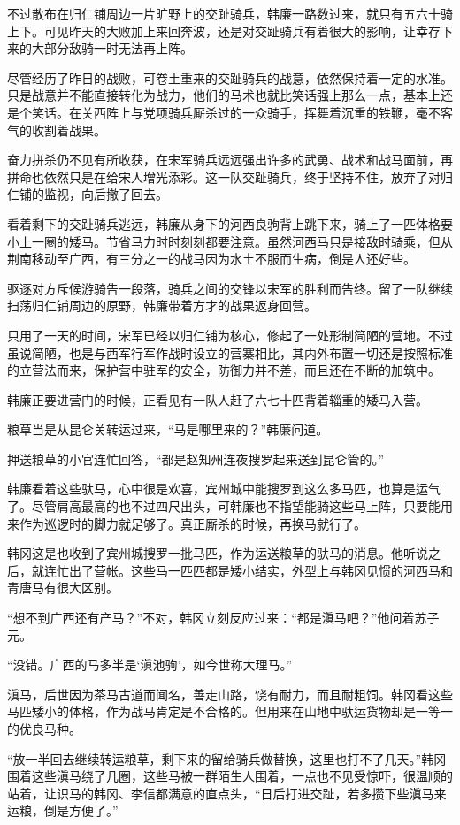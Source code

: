不过散布在归仁铺周边一片旷野上的交趾骑兵，韩廉一路数过来，就只有五六十骑上下。可见昨天的大败加上来回奔波，还是对交趾骑兵有着很大的影响，让幸存下来的大部分敌骑一时无法再上阵。

尽管经历了昨日的战败，可卷土重来的交趾骑兵的战意，依然保持着一定的水准。只是战意并不能直接转化为战力，他们的马术也就比笑话强上那么一点，基本上还是个笑话。在关西阵上与党项骑兵厮杀过的一众骑手，挥舞着沉重的铁鞭，毫不客气的收割着战果。

奋力拼杀仍不见有所收获，在宋军骑兵远远强出许多的武勇、战术和战马面前，再拼命也依然只是在给宋人增光添彩。这一队交趾骑兵，终于坚持不住，放弃了对归仁铺的监视，向后撤了回去。

看着剩下的交趾骑兵逃远，韩廉从身下的河西良驹背上跳下来，骑上了一匹体格要小上一圈的矮马。节省马力时时刻刻都要注意。虽然河西马只是接敌时骑乘，但从荆南移动至广西，有三分之一的战马因为水土不服而生病，倒是人还好些。

驱逐对方斥候游骑告一段落，骑兵之间的交锋以宋军的胜利而告终。留了一队继续扫荡归仁铺周边的原野，韩廉带着方才的战果返身回营。

只用了一天的时间，宋军已经以归仁铺为核心，修起了一处形制简陋的营地。不过虽说简陋，也是与西军行军作战时设立的营寨相比，其内外布置一切还是按照标准的立营法而来，保护营中驻军的安全，防御力并不差，而且还在不断的加筑中。

韩廉正要进营门的时候，正看见有一队人赶了六七十匹背着辎重的矮马入营。

粮草当是从昆仑关转运过来，“马是哪里来的？”韩廉问道。

押送粮草的小官连忙回答，“都是赵知州连夜搜罗起来送到昆仑管的。”

韩廉看着这些驮马，心中很是欢喜，宾州城中能搜罗到这么多马匹，也算是运气了。尽管肩高最高的也不过四尺出头，可韩廉也不指望能骑这些马上阵，只要能用来作为巡逻时的脚力就足够了。真正厮杀的时候，再换马就行了。

韩冈这是也收到了宾州城搜罗一批马匹，作为运送粮草的驮马的消息。他听说之后，就连忙出了营帐。这些马一匹匹都是矮小结实，外型上与韩冈见惯的河西马和青唐马有很大区别。

“想不到广西还有产马？”不对，韩冈立刻反应过来：“都是滇马吧？”他问着苏子元。

“没错。广西的马多半是‘滇池驹’，如今世称大理马。”

滇马，后世因为茶马古道而闻名，善走山路，饶有耐力，而且耐粗饲。韩冈看这些马匹矮小的体格，作为战马肯定是不合格的。但用来在山地中驮运货物却是一等一的优良马种。

“放一半回去继续转运粮草，剩下来的留给骑兵做替换，这里也打不了几天。”韩冈围着这些滇马绕了几圈，这些马被一群陌生人围着，一点也不见受惊吓，很温顺的站着，让识马的韩冈、李信都满意的直点头，“日后打进交趾，若多攒下些滇马来运粮，倒是方便了。”

